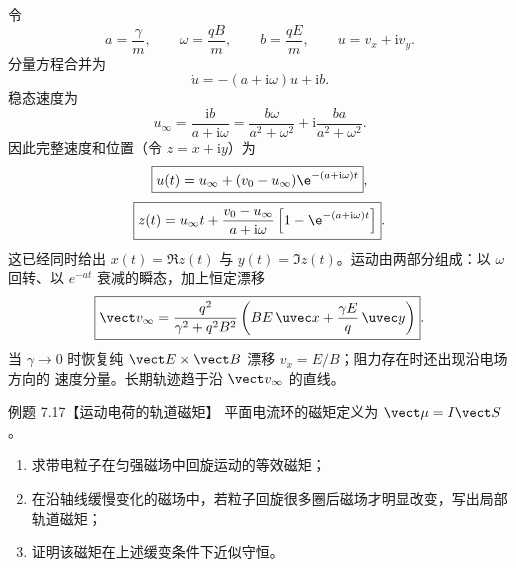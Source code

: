 \begin{xesolution}
令
\[
  a=\frac\gamma m,
  \qquad \omega=\frac{qB}{m},
  \qquad b=\frac{qE}{m},
  \qquad u=v_x+\mathrm i v_y.
\]
分量方程合并为
\begin{equation}
  \dot u=-(a+\mathrm i\omega)u+\mathrm i b.
\end{equation}
稳态速度为
\begin{equation}
  u_\infty=\frac{\mathrm i b}{a+\mathrm i\omega}
  =\frac{b\omega}{a^2+\omega^2}
  +\mathrm i\frac{ba}{a^2+\omega^2}.
\end{equation}
因此完整速度和位置（令 $z=x+\mathrm i y$）为
\begin{equation}
  \boxed{u(t)=u_\infty+(v_0-u_\infty)\e^{-(a+\mathrm i\omega)t}},
\end{equation}
\begin{equation}
  \boxed{z(t)=u_\infty t+
  \frac{v_0-u_\infty}{a+\mathrm i\omega}
  \left[1-\e^{-(a+\mathrm i\omega)t}\right]}.
\end{equation}
这已经同时给出 $x(t)=\Re z(t)$ 与 $y(t)=\Im z(t)$。运动由两部分组成：以
$\omega$ 回转、以 $e^{-at}$ 衰减的瞬态，加上恒定漂移
\begin{equation}
  \boxed{\vect v_\infty=
  \frac{q^2}{\gamma^2+q^2B^2}
  \left(BE\,\uvec x+\frac{\gamma E}{q}\,\uvec y\right)}.
\end{equation}
当 $\gamma\to0$ 时恢复纯 $\vect E\times\vect B$ 漂移 $v_x=E/B$；阻力存在时还出现沿电场方向的
速度分量。长期轨迹趋于沿 $\vect v_\infty$ 的直线。

\dampedDriftDiagram
\end{xesolution}

\Needspace{0.50\textheight}
\begin{origexamplebox}{例题 7.17【运动电荷的轨道磁矩】}
平面电流环的磁矩定义为 $\vect\mu=I\vect S$。
\begin{enumerate}[label=(\arabic*),leftmargin=2.2em]
  \item 求带电粒子在匀强磁场中回旋运动的等效磁矩；
  \item 在沿轴线缓慢变化的磁场中，若粒子回旋很多圈后磁场才明显改变，写出局部轨道磁矩；
  \item 证明该磁矩在上述缓变条件下近似守恒。
\end{enumerate}
\end{origexamplebox}

